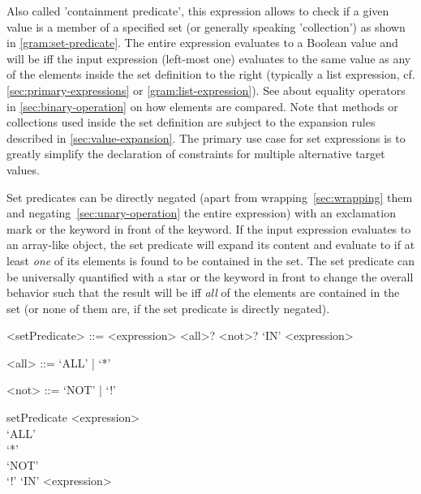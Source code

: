 \documentclass[11pt,a4paper]{article}
\begin{document}
Also called 'containment predicate', this expression allows to check if a given value is a member of a specified set (or generally speaking 'collection') as shown in \cref{gram:set-predicate}. 
The entire expression evaluates to a Boolean value and will be  iff the input expression (left-most one) evaluates to the same value as any of the elements inside the set definition to the right (typically a list expression, cf. \cref{sec:primary-expressions} or \cref{gram:list-expression}). 
See about equality operators in \cref{sec:binary-operation} on how elements are compared. 
Note that methods or collections used inside the set definition are subject to the expansion rules described in \cref{sec:value-expansion}.
The primary use case for set expressions is to greatly simplify the declaration of constraints for multiple alternative target values. 

Set predicates can be directly negated (apart from wrapping~\ref{sec:wrapping} them and negating~\ref{sec:unary-operation} the entire expression) with an exclamation mark \lit{!} or the keyword  in front of the  keyword. 
If the input expression evaluates to an array-like object, the set predicate will expand its content and evaluate to  if at least \textit{one} of its elements is found to be contained in the set. 
The set predicate can be universally quantified with a star \lit{*} or the  keyword in front to change the overall behavior such that the result will be  iff \textit{all} of the elements are contained in the set (or none of them are, if the set predicate is directly negated).

\begin{gram}
	\label{gram:set-predicate}
	\begin{grammar}	
		<setPredicate> ::= <expression> <all>? <not>? `IN' <expression>
		
		<all> ::=  `ALL' | `*'
		
		<not> ::=  `NOT' | `!'
	\end{grammar}
	\diagsep
	
	\begin{rrdiag*}{setPredicate}
		<expression> \sst \\ `ALL' \\ `*' \est \sst \\ `NOT' \\ `!' \est `IN' <expression>
	\end{rrdiag*}
\end{gram}
\end{document}
